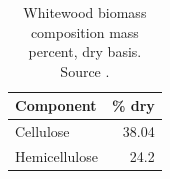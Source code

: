 \begin{table}[H]
    \centering
    \caption{Whitewood biomass composition mass percent, dry basis. Source \cite{Unknown-2020}.}
    \begin{tabular}{lr}
        \toprule
        Component & \% dry \\
        \midrule
        Cellulose       & 38.04 \\
        Hemicellulose   & 24.2  \\
        \bottomrule
    \end{tabular}
\end{table}
